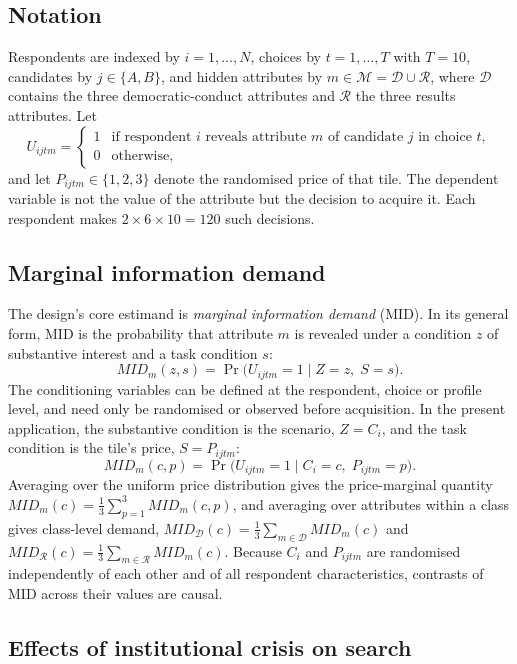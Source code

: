\documentclass[11pt]{article}
\newcommand{\MID}{\mathit{MID}}
\newcommand{\Dem}{\mathcal{D}}
\newcommand{\Res}{\mathcal{R}}
\begin{document}
\subsection{Notation}

Respondents are indexed by $i=1,\dots,N$, choices by $t=1,\dots,T$ with $T=10$, candidates by $j\in\{A,B\}$, and hidden attributes by $m\in\mathcal{M}=\Dem\cup\Res$, where $\Dem$ contains the three democratic-conduct attributes and $\Res$ the three results attributes. Let
\[
U_{ijtm}=
\begin{cases}
1 & \text{if respondent } i \text{ reveals attribute } m \text{ of candidate } j \text{ in choice } t,\\
0 & \text{otherwise,}
\end{cases}
\]
and let $P_{ijtm}\in\{1,2,3\}$ denote the randomised price of that tile. The dependent variable is not the value of the attribute but the decision to acquire it. Each respondent makes $2\times6\times10=120$ such decisions.

\subsection{Marginal information demand}

The design's core estimand is \emph{marginal information demand} (MID). In its general form, MID is the probability that attribute $m$ is revealed under a condition $z$ of substantive interest and a task condition $s$:
\[
\MID_m(z,s)=\Pr\bigl(U_{ijtm}=1 \mid Z=z,\; S=s\bigr).
\]
The conditioning variables can be defined at the respondent, choice or profile level, and need only be randomised or observed before acquisition. In the present application, the substantive condition is the scenario, $Z=C_i$, and the task condition is the tile's price, $S=P_{ijtm}$:
\[
\MID_m(c,p)=\Pr\bigl(U_{ijtm}=1 \mid C_i=c,\; P_{ijtm}=p\bigr).
\]
Averaging over the uniform price distribution gives the price-marginal quantity $\MID_m(c)=\tfrac{1}{3}\sum_{p=1}^{3}\MID_m(c,p)$, and averaging over attributes within a class gives class-level demand, $\MID_{\Dem}(c)=\tfrac{1}{3}\sum_{m\in\Dem}\MID_m(c)$ and $\MID_{\Res}(c)=\tfrac{1}{3}\sum_{m\in\Res}\MID_m(c)$. Because $C_i$ and $P_{ijtm}$ are randomised independently of each other and of all respondent characteristics, contrasts of MID across their values are causal.

\subsection{Effects of institutional crisis on search}
\end{document}
